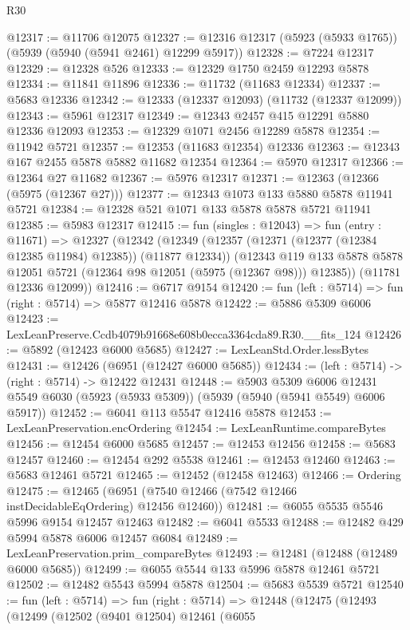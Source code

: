 \begin{lexlean}{R30}
\begin{coremodule}
@12317 := @11706 @12075
@12327 := @12316 @12317 (@5923 (@5933 @1765)) (@5939 (@5940 (@5941 @2461) @12299 @5917))
@12328 := @7224 @12317
@12329 := @12328 @526
@12333 := @12329 @1750 @2459 @12293 @5878
@12334 := @11841 @11896
@12336 := @11732 (@11683 @12334)
@12337 := @5683 @12336
@12342 := @12333 (@12337 @12093) (@11732 (@12337 @12099))
@12343 := @5961 @12317
@12349 := @12343 @2457 @415 @12291 @5880 @12336 @12093
@12353 := @12329 @1071 @2456 @12289 @5878
@12354 := @11942 @5721
@12357 := @12353 (@11683 @12354) @12336
@12363 := @12343 @167 @2455 @5878 @5882 @11682 @12354
@12364 := @5970 @12317
@12366 := @12364 @27 @11682
@12367 := @5976 @12317
@12371 := @12363 (@12366 (@5975 (@12367 @27)))
@12377 := @12343 @1073 @133 @5880 @5878 @11941 @5721
@12384 := @12328 @521 @1071 @133 @5878 @5878 @5721 @11941
@12385 := @5983 @12317
@12415 := fun (singles : @12043) =>
  fun (entry : @11671) =>
  @12327
    (@12342
      (@12349
        (@12357 (@12371 (@12377 (@12384 @12385 @11984) @12385)) (@11877 @12334))
        (@12343 @119 @133 @5878 @5878 @12051 @5721 (@12364 @98 @12051 (@5975 (@12367 @98))) @12385))
      (@11781 @12336 @12099))
@12416 := @6717 @9154
@12420 := fun (left : @5714) => fun (right : @5714) => @5877 @12416 @5878
@12422 := @5886 @5309 @6006
@12423 := LexLeanPreserve.Ccdb4079b91668e608b0ecca3364cda89.R30.__fits_124
@12426 := @5892 (@12423 @6000 @5685)
@12427 := LexLeanStd.Order.lessBytes
@12431 := @12426 (@6951 (@12427 @6000 @5685))
@12434 := (left : @5714) -> (right : @5714) -> @12422 @12431
@12448 := @5903
    @5309
    @6006
    @12431
    @5549
    @6030
    (@5923 (@5933 @5309))
    (@5939 (@5940 (@5941 @5549) @6006 @5917))
@12452 := @6041 @113 @5547 @12416 @5878
@12453 := LexLeanPreservation.encOrdering
@12454 := LexLeanRuntime.compareBytes
@12456 := @12454 @6000 @5685
@12457 := @12453 @12456
@12458 := @5683 @12457
@12460 := @12454 @292 @5538
@12461 := @12453 @12460
@12463 := @5683 @12461 @5721
@12465 := @12452 (@12458 @12463)
@12466 := Ordering
@12475 := @12465 (@6951 (@7540 @12466 (@7542 @12466 instDecidableEqOrdering) @12456 @12460))
@12481 := @6055 @5535 @5546 @5996 @9154 @12457 @12463
@12482 := @6041 @5533
@12488 := @12482 @429 @5994 @5878 @6006 @12457 @6084
@12489 := LexLeanPreservation.prim_compareBytes
@12493 := @12481 (@12488 (@12489 @6000 @5685))
@12499 := @6055 @5544 @133 @5996 @5878 @12461 @5721
@12502 := @12482 @5543 @5994 @5878
@12504 := @5683 @5539 @5721
@12540 := fun (left : @5714) =>
  fun (right : @5714) =>
  @12448
    (@12475
      (@12493
        (@12499
          (@12502
            (@9401 @12504)
            @12461
            (@6055

\end{coremodule}
\end{lexlean}
